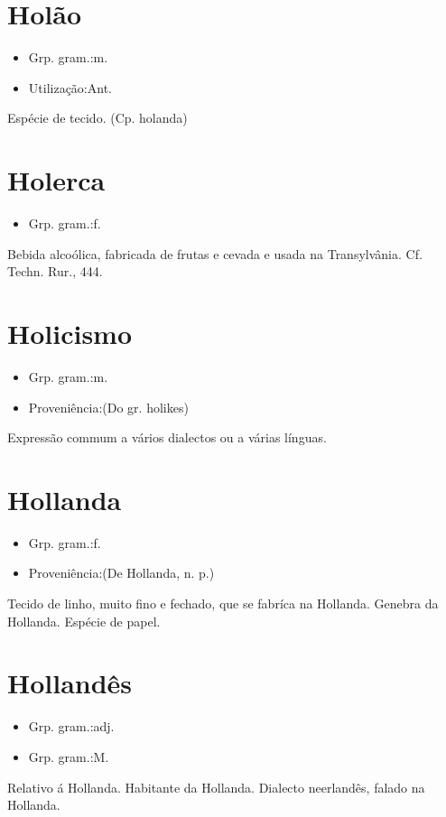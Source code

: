 \documentclass{article}
\begin{document}
\section{Holão}
\begin{itemize}
\item {Grp. gram.:m.}
\end{itemize}
\begin{itemize}
\item {Utilização:Ant.}
\end{itemize}
Espécie de tecido.
(Cp. \textunderscore holanda\textunderscore )
\section{Holerca}
\begin{itemize}
\item {Grp. gram.:f.}
\end{itemize}
Bebida alcoólica, fabricada de frutas e cevada e usada na Transylvânia. Cf. \textunderscore Techn. Rur.\textunderscore , 444.
\section{Holicismo}
\begin{itemize}
\item {Grp. gram.:m.}
\end{itemize}
\begin{itemize}
\item {Proveniência:(Do gr. \textunderscore holikes\textunderscore )}
\end{itemize}
Expressão commum a vários dialectos ou a várias línguas.
\section{Hollanda}
\begin{itemize}
\item {Grp. gram.:f.}
\end{itemize}
\begin{itemize}
\item {Proveniência:(De \textunderscore Hollanda\textunderscore , n. p.)}
\end{itemize}
Tecido de linho, muito fino e fechado, que se fabríca na Hollanda.
Genebra da Hollanda.
Espécie de papel.
\section{Hollandês}
\begin{itemize}
\item {Grp. gram.:adj.}
\end{itemize}
\begin{itemize}
\item {Grp. gram.:M.}
\end{itemize}
Relativo á Hollanda.
Habitante da Hollanda.
Dialecto neerlandês, falado na Hollanda.
\end{document}
